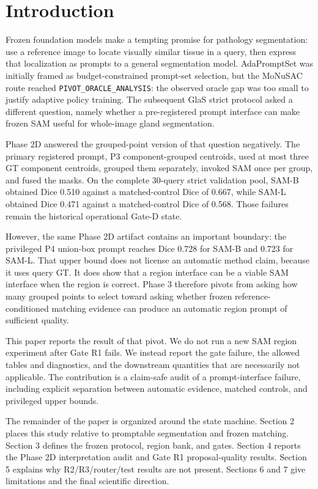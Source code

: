 \section{Introduction}

Frozen foundation models make a tempting promise for pathology segmentation: use a reference image to locate visually similar tissue in a query, then express that localization as prompts to a general segmentation model. AdaPromptSet was initially framed as budget-constrained prompt-set selection, but the MoNuSAC route reached \texttt{PIVOT\_ORACLE\_ANALYSIS}: the observed oracle gap was too small to justify adaptive policy training. The subsequent GlaS strict protocol asked a different question, namely whether a pre-registered prompt interface can make frozen SAM useful for whole-image gland segmentation.

Phase 2D answered the grouped-point version of that question negatively. The primary registered prompt, P3 component-grouped centroids, used at most three GT component centroids, grouped them separately, invoked SAM once per group, and fused the masks. On the complete 30-query strict validation pool, SAM-B obtained Dice 0.510 against a matched-control Dice of 0.667, while SAM-L obtained Dice 0.471 against a matched-control Dice of 0.568. Those failures remain the historical operational Gate-D state.

However, the same Phase 2D artifact contains an important boundary: the privileged P4 union-box prompt reaches Dice 0.728 for SAM-B and 0.723 for SAM-L. That upper bound does not license an automatic method claim, because it uses query GT. It does show that a region interface can be a viable SAM interface when the region is correct. Phase 3 therefore pivots from asking how many grouped points to select toward asking whether frozen reference-conditioned matching evidence can produce an automatic region prompt of sufficient quality.

This paper reports the result of that pivot. We do not run a new SAM region experiment after Gate R1 fails. We instead report the gate failure, the allowed tables and diagnostics, and the downstream quantities that are necessarily not applicable. The contribution is a claim-safe audit of a prompt-interface failure, including explicit separation between automatic evidence, matched controls, and privileged upper bounds.



The remainder of the paper is organized around the state machine. Section 2 places this study relative to promptable segmentation and frozen matching. Section 3 defines the frozen protocol, region bank, and gates. Section 4 reports the Phase 2D interpretation audit and Gate R1 proposal-quality results. Section 5 explains why R2/R3/router/test results are not present. Sections 6 and 7 give limitations and the final scientific direction.
